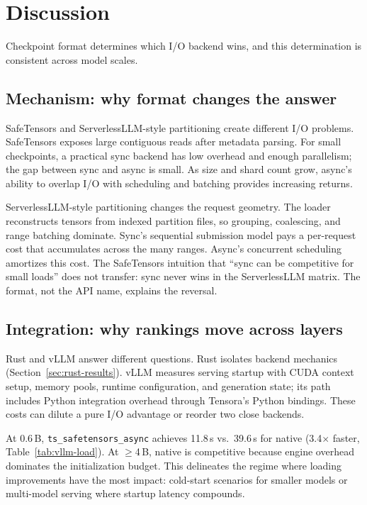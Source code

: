 \section{Discussion}
\label{sec:discussion}

Checkpoint format determines which I/O backend wins, and this determination is consistent across model scales.

\subsection{Mechanism: why format changes the answer}

SafeTensors and ServerlessLLM-style partitioning create different I/O problems. SafeTensors exposes large contiguous reads after metadata parsing. For small checkpoints, a practical sync backend has low overhead and enough parallelism; the gap between sync and async is small. As size and shard count grow, async's ability to overlap I/O with scheduling and batching provides increasing returns.

ServerlessLLM-style partitioning changes the request geometry. The loader reconstructs tensors from indexed partition files, so grouping, coalescing, and range batching dominate. Sync's sequential submission model pays a per-request cost that accumulates across the many ranges. Async's concurrent scheduling amortizes this cost. The SafeTensors intuition that ``sync can be competitive for small loads'' does not transfer: sync never wins in the ServerlessLLM matrix. The format, not the API name, explains the reversal.

\subsection{Integration: why rankings move across layers}

Rust and vLLM answer different questions. Rust isolates backend mechanics (Section~\ref{sec:rust-results}). vLLM measures serving startup with CUDA context setup, memory pools, runtime configuration, and generation state; its path includes Python integration overhead through Tensora's Python bindings. These costs can dilute a pure I/O advantage or reorder two close backends.

At 0.6\,B, \texttt{ts\_safetensors\_async} achieves 11.8\,s vs.\ 39.6\,s for native (3.4$\times$ faster, Table~\ref{tab:vllm-load}). At $\geq$4\,B, native is competitive because engine overhead dominates the initialization budget. This delineates the regime where loading improvements have the most impact: cold-start scenarios for smaller models or multi-model serving where startup latency compounds.

